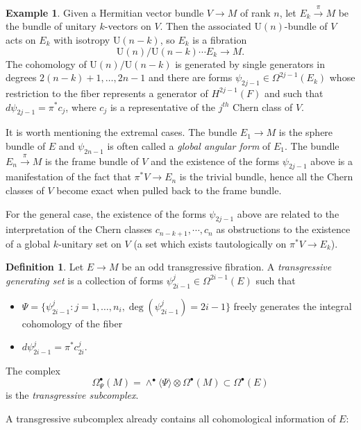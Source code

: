 \documentclass[12pt,twoside]{article}
\theoremstyle{plain}
\theoremstyle{definition}
\newtheorem{definition}[theorem]{Definition}
\newtheorem{example}[theorem]{Example}
\newcommand{\U}{\mathrm{U}}
\newcommand{\tensor}{\otimes}
\newcommand{\IP}[1]{\langle #1 \rangle}
\numberwithin{equation}{section}
\begin{document}
\begin{example}
Given a Hermitian vector bundle $V \to M$ of rank $n$, let $E_k \stackrel{\pi}{\longrightarrow} M$ be the bundle of unitary $k$-vectors on $V$. Then the associated $\U(n)$-bundle of $V$ acts on $E_k$ with isotropy $\U(n-k)$, so $E_k$ is a fibration
\[\U(n)/\U(n-k)\cdots E_k \to M.\]
The cohomology of  $\U(n)/\U(n-k)$ is generated by single generators in degrees $2(n-k)+1, \dots, 2n-1$ and there are forms $\psi_{2j-1}\in \Omega^{2j-1}(E_k)$ whose restriction to the fiber represents a  generator of $H^{2j-1}(F)$ and such that $d \psi_{2j-1} = \pi^*c_{j}$, where $c_{j}$ is a representative of the $j^{th}$ Chern class of $V$.

It is worth mentioning the extremal cases. The bundle $E_1 \to M$ is the sphere bundle of $E$ and $\psi_{2n-1}$ is often called a {\it global angular form}  of $E_1$. The bundle $E_n\stackrel{\pi}{\longrightarrow}{M}$ is the frame bundle of $V$ and the existence of the forms $\psi_{2j-1}$ above is a manifestation of the fact that $\pi^*V \to E_n$ is the trivial bundle, hence all the Chern classes of $V$ become exact when pulled back to the frame bundle.

For the general case, the existence of the forms $\psi_{2j-1}$ above are related to the interpretation of the Chern classes  $c_{n-k+1}, \cdots, c_n$ as obstructions to the existence of a global $k$-unitary set on $V$ (a set which exists tautologically on $\pi^*V \to E_k$).
\end{example}

\begin{definition}
Let $E \to M$ be an odd transgressive fibration. A {\it transgressive generating set} is a collection of forms $\psi_{2i-1}^j \in \Omega^{2i-1}(E)$ such that
\begin{itemize}
\item $\Psi = \{ \psi_{2i-1}^j:j=1,\dots, n_i, \deg(\psi_{2i-1}^j) = 2i-1 \}$ freely generates the integral cohomology of the fiber
\item $d\psi_{2i-1}^j = \pi^*c_{2i}^j$.
\end{itemize}
The complex
\[\Omega_{\Psi}^\bullet(M) =  \wedge^{\bullet}\IP{\Psi}\tensor\Omega^\bullet(M) \subset \Omega^{\bullet}(E)\]
is the {\it transgressive subcomplex}.
\end{definition}

A transgressive subcomplex already contains all cohomological information of $E$:
\end{document}
